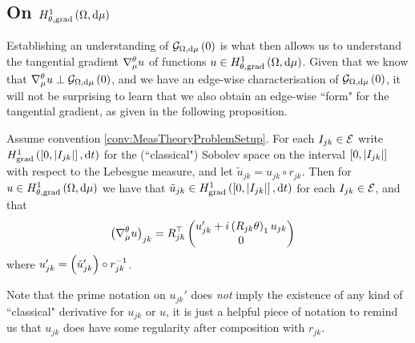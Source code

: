 \subsection{On $H^1_{\theta, \mathrm{grad}}\left( \Omega, \mathrm{d}\mu \right)$} \label{ssec:SobSpacesTheory}
Establishing an understanding of $\mathcal{G}_{ \Omega, \mathrm{d}\mu}\left( 0 \right)$ is what then allows us to understand the tangential gradient $\nabla^{\theta}_\mu u$ of functions $u\in H^1_{\theta, \mathrm{grad}}\left( \Omega, \mathrm{d}\mu \right)$.
Given that we know that $\nabla^{\theta}_\mu u \perp \mathcal{G}_{ \Omega, \mathrm{d}\mu}\left( 0 \right)$, and we have an edge-wise characterisation of $\mathcal{G}_{ \Omega, \mathrm{d}\mu}\left( 0 \right)$, it will not be surprising to learn that we also obtain an edge-wise ``form" for the tangential gradient, as given in the following proposition.
\begin{prop} \label{prop:GraphTangGrad}
	Assume convention \ref{conv:MeasTheoryProblemSetup}.
	For each $I_{jk}\in \mathcal{E}$ write $H^1_\mathrm{grad}\left( \left[ 0,\left\lvert I_{jk} \right\rvert \right], \mathrm{d}t \right)$ for the (``classical") Sobolev space on the interval $\left[ 0,\left\lvert I_{jk} \right\rvert \right]$ with respect to the Lebesgue measure, and let $\tilde{u}_{jk} = u_{jk} \circ r_{jk}$.
	Then for $u\in H^1_{\theta, \mathrm{grad}}\left( \Omega, \mathrm{d}\mu \right)$ we have that $\tilde{u}_{jk}\in H^1_\mathrm{grad}\left( \left[ 0,\left\lvert I_{jk} \right\rvert \right], \mathrm{d}t \right)$ for each $I_{jk}\in \mathcal{E}$, and that
	\begin{align*}
		\left(  \nabla^{\theta}_\mu u  \right)_{jk} 
		&= R_{jk}^\top \begin{pmatrix} u_{jk}' + i\left( R_{jk}\theta \right)_1 u_{jk} \\ 0	\end{pmatrix}
	\end{align*}
	where $u_{jk}' = \left(  \tilde{u}_{jk}'  \right) \circ r_{jk}^{-1}$.
\end{prop}
Note that the prime notation on $u_{jk}'$ does \emph{not} imply the existence of any kind of ``classical" derivative for $u_{jk}$ or $u$, it is just a helpful piece of notation to remind us that $u_{jk}$ does have some regularity after composition with $r_{jk}$.
